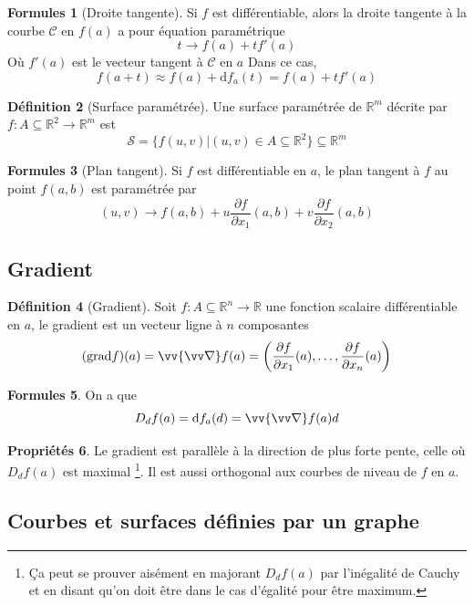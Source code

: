 \documentclass[11pt,a4paper]{article}
\theoremstyle{definition}
\newtheorem{mydef}{Définition}[section]
\newtheorem{myprop}[mydef]{Propriétés}
\newtheorem{myform}[mydef]{Formules}
\newcommand{\R}{\mathbb{R}}
\newcommand{\dif}{\mathrm{d}}
\let\oldnabla\nabla
\renewcommand{\nabla}{\vv{\oldnabla}}
\newcommand{\fl}{\rightarrow}
\newcommand{\pa}{\partial}
\begin{document}
\begin{myform}[Droite tangente]
Si $f$ est différentiable, alors la droite tangente à la courbe $\mathcal{C}$ en $f(a)$ a pour équation paramétrique
\[ t \fl f(a) + t f'(a) \]
Où $f'(a)$ est le vecteur tangent à $\mathcal{C}$ en $a$
Dans ce cas,
\[ f(a + t) \approx f(a) + \dif f_a(t) = f(a) + t f'(a) \]
\end{myform}

\begin{mydef}[Surface paramétrée]
Une surface paramétrée de $\R^m$ décrite par $f : A \subseteq \R^2 \fl \R^m$ est
\[ \mathcal{S} = \{ f(u,v) | (u,v) \in A \subseteq \R^2 \} \subseteq \R^m \]
\end{mydef}

\begin{myform}[Plan tangent]
Si $f$ est différentiable en $a$, le plan tangent à $f$ au point $f(a,b)$ est paramétrée par
\[ (u,v) \fl f(a,b) + u \frac{\pa f}{\pa x_1} (a,b) + v \frac{\pa f}{\pa x_2}(a,b) \]
\end{myform}

\subsection{Gradient}

\begin{mydef}[Gradient] Soit $f : A \subseteq \R^n \fl \R$ une fonction scalaire différentiable en $a$, le gradient est un vecteur ligne à $n$ composantes
\[ (\mathrm{grad} f)(a) = \nabla f(a) = \left( \frac{\pa f}{\pa x_1}(a) , \dots, \frac{\pa f}{\pa x_n}(a) \right) \]
\end{mydef}

\begin{myform} On a que
\[ D_df(a) = \dif f_a(d) = \nabla f(a) d \]
\end{myform}

\begin{myprop} Le gradient est parallèle à la direction de plus forte pente,
	celle où $D_df(a)$ est maximal
	\footnote{\c{C}a peut se prouver aisément en majorant $D_df(a)$ par l'inégalité de Cauchy et en disant qu'on doit être dans le cas d'égalité pour être maximum.}.
	Il est aussi orthogonal aux courbes de niveau de $f$ en $a$. \end{myprop}

\subsection{Courbes et surfaces définies par un graphe}
\end{document}
